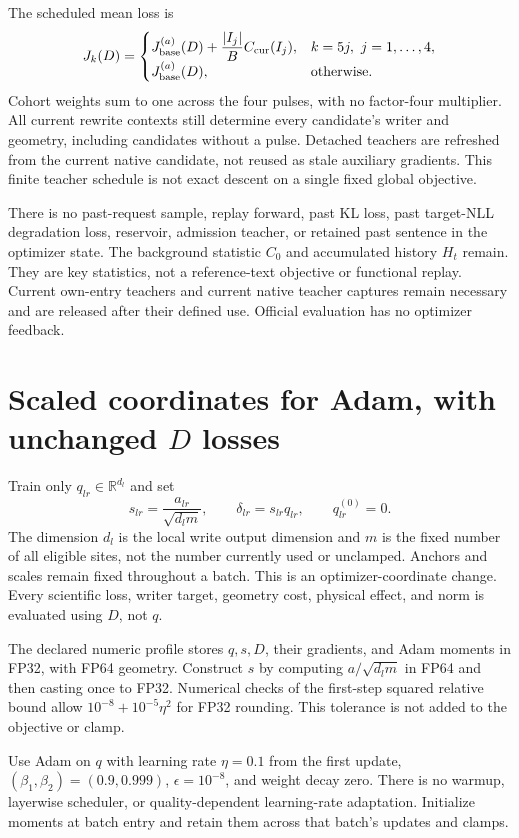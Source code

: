\documentclass[10pt]{article}
\newcommand{\RR}{\mathbb R}
\begin{document}
The scheduled mean loss is
\[
 J_k(D)=
 \begin{cases}
 J_{\rm base}^{(a)}(D)+\dfrac{|I_j|}{B}C_{\rm cur}(I_j),
      &k=5j,\ j=1,\ldots,4,\\[3pt]
 J_{\rm base}^{(a)}(D),&\text{otherwise}.
 \end{cases}
\]
Cohort weights sum to one across the four pulses, with no factor-four
multiplier. All current rewrite contexts still determine every candidate's
writer and geometry, including candidates without a pulse. Detached
teachers are refreshed from the current native candidate, not reused
as stale auxiliary gradients. This finite teacher schedule is not exact
descent on a single fixed global objective.

There is no past-request sample, replay forward, past KL loss, past
target-NLL degradation loss, reservoir, admission teacher, or retained
past sentence in the optimizer state. The background statistic $C_0$
and accumulated history $H_t$ remain. They are key statistics, not a
reference-text objective or functional replay. Current own-entry teachers
and current native teacher captures remain necessary and are released
after their defined use. Official evaluation has no optimizer feedback.

\newpage
\section{Scaled coordinates for Adam, with unchanged $D$ losses}
Train only $q_{lr}\in\RR^{d_l}$ and set
\[
 s_{lr}=\frac{a_{lr}}{\sqrt{d_lm}},\qquad
 \delta_{lr}=s_{lr}q_{lr},\qquad q_{lr}^{(0)}=0.
 \label{eq:coordinates}
\]
The dimension $d_l$ is the local write output dimension and $m$ is the
fixed number of all eligible sites, not the number currently used or
unclamped. Anchors and scales remain fixed throughout a batch. This is
an optimizer-coordinate change. Every scientific loss, writer target,
geometry cost, physical effect, and norm is evaluated using $D$, not $q$.

The declared numeric profile stores $q,s,D$, their gradients, and Adam
moments in FP32, with FP64 geometry. Construct $s$ by computing
$a/\sqrt{d_lm}$ in FP64 and then casting once to FP32. Numerical checks
of the first-step squared relative bound allow
$10^{-8}+10^{-5}\eta^2$ for FP32 rounding. This tolerance is not added
to the objective or clamp.

Use Adam on $q$ with learning rate $\eta=0.1$ from the first update,
$(\beta_1,\beta_2)=(0.9,0.999)$, $\epsilon=10^{-8}$, and weight decay
zero. There is no warmup, layerwise scheduler, or quality-dependent
learning-rate adaptation. Initialize moments at batch entry and retain
them across that batch's updates and clamps.
\end{document}
